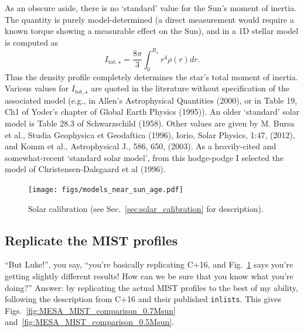 \documentclass{article}
\begin{document}
As an obscure aside, there is no `standard' value for the Sun's moment of 
inertia. The quantity is purely model-determined (a direct measurement would 
require a known torque showing a measurable effect on the Sun), and in a 1D 
stellar model is computed as 
\begin{equation}
I_{\mathrm{tot,\star}} = \frac{8\pi}{3} \int_0^{R_\star} r^4 \rho(r) dr.
\end{equation}
Thus the density profile completely determines the star's total moment of 
inertia. Various values for $I_\mathrm{tot,\star}$ are quoted in the 
literature without specification of the associated model (e.g., in Allen's 
Astrophysical Quantities (2000), or in Table 19, Ch1 of Yoder's chapter of 
Global Earth Physics (1995)). An older `standard' solar model is Table 28.3 of 
Schwarzschild (1958). Other values are given by M. Bursa et al., Studia 
Geophysica et Geodaftica (1996), Iorio, Solar Physics, 1:47, (2012), and Komm 
et al., Astrophysical J., 586, 650, (2003).
As a heavily-cited and somewhat-recent `standard solar model', from this 
hodge-podge I selected the model of Christensen-Dalsgaard et al (1996). 


\begin{figure}[t]
	\centering
	\texttt{[image: figs/models\_near\_sun\_age.pdf]}
	\caption{Solar calibration (see Sec.~\ref{sec:solar_calibration} for 
	description).}
	\label{fig:models_near_sun_age}
\end{figure}


\subsection{Replicate the MIST profiles}
\label{sec:replicate_MIST}
``But Luke!'', you say, ``you're basically replicating C+16, and 
Fig.~\ref{fig:models_near_sun_age} says you're getting slightly different 
results! How can we be sure that you know what you're doing?''
Answer: by replicating the actual MIST profiles to the best of my ability,
following the description from C+16 and their published \texttt{inlists}.
This gives Figs.~\ref{fig:MESA_MIST_comparison_0.7Msun} 
and~\ref{fig:MESA_MIST_comparison_0.5Msun}.
\end{document}
